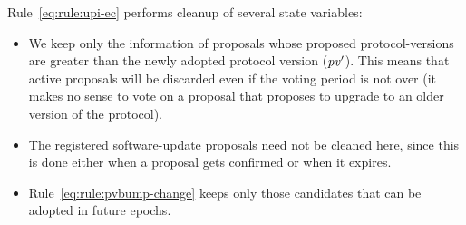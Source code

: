 Rule~\ref{eq:rule:upi-ec} performs cleanup of several state variables:
\begin{itemize}
\item We keep only the information of proposals whose proposed
  protocol-versions are greater than the newly adopted protocol version
  ($\mathit{pv'}$). This means that active proposals will be discarded even if the
  voting period is not over (it makes no sense to vote on a proposal that
  proposes to upgrade to an older version of the protocol).
\item The registered software-update proposals need not be cleaned here, since
  this is done either when a proposal gets confirmed or when it expires.
\item Rule~\ref{eq:rule:pvbump-change} keeps only those candidates that can be
  adopted in future epochs.
\end{itemize}

